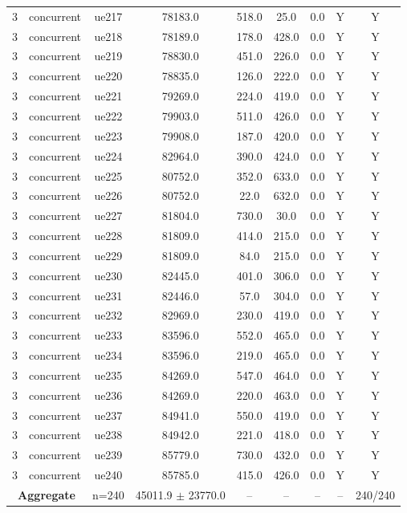 \begin{table}[ht]
\begin{tabular}{|c|c|c|c|c|c|c|c|c|}
3 & concurrent & ue217 & 78183.0 & 518.0 & 25.0 & 0.0 & Y & Y \\
3 & concurrent & ue218 & 78189.0 & 178.0 & 428.0 & 0.0 & Y & Y \\
3 & concurrent & ue219 & 78830.0 & 451.0 & 226.0 & 0.0 & Y & Y \\
3 & concurrent & ue220 & 78835.0 & 126.0 & 222.0 & 0.0 & Y & Y \\
3 & concurrent & ue221 & 79269.0 & 224.0 & 419.0 & 0.0 & Y & Y \\
3 & concurrent & ue222 & 79903.0 & 511.0 & 426.0 & 0.0 & Y & Y \\
3 & concurrent & ue223 & 79908.0 & 187.0 & 420.0 & 0.0 & Y & Y \\
3 & concurrent & ue224 & 82964.0 & 390.0 & 424.0 & 0.0 & Y & Y \\
3 & concurrent & ue225 & 80752.0 & 352.0 & 633.0 & 0.0 & Y & Y \\
3 & concurrent & ue226 & 80752.0 & 22.0 & 632.0 & 0.0 & Y & Y \\
3 & concurrent & ue227 & 81804.0 & 730.0 & 30.0 & 0.0 & Y & Y \\
3 & concurrent & ue228 & 81809.0 & 414.0 & 215.0 & 0.0 & Y & Y \\
3 & concurrent & ue229 & 81809.0 & 84.0 & 215.0 & 0.0 & Y & Y \\
3 & concurrent & ue230 & 82445.0 & 401.0 & 306.0 & 0.0 & Y & Y \\
3 & concurrent & ue231 & 82446.0 & 57.0 & 304.0 & 0.0 & Y & Y \\
3 & concurrent & ue232 & 82969.0 & 230.0 & 419.0 & 0.0 & Y & Y \\
3 & concurrent & ue233 & 83596.0 & 552.0 & 465.0 & 0.0 & Y & Y \\
3 & concurrent & ue234 & 83596.0 & 219.0 & 465.0 & 0.0 & Y & Y \\
3 & concurrent & ue235 & 84269.0 & 547.0 & 464.0 & 0.0 & Y & Y \\
3 & concurrent & ue236 & 84269.0 & 220.0 & 463.0 & 0.0 & Y & Y \\
3 & concurrent & ue237 & 84941.0 & 550.0 & 419.0 & 0.0 & Y & Y \\
3 & concurrent & ue238 & 84942.0 & 221.0 & 418.0 & 0.0 & Y & Y \\
3 & concurrent & ue239 & 85779.0 & 730.0 & 432.0 & 0.0 & Y & Y \\
3 & concurrent & ue240 & 85785.0 & 415.0 & 426.0 & 0.0 & Y & Y \\
\multicolumn{2}{|c|}{\textbf{Aggregate}} & n=240 & 45011.9 $\pm$ 23770.0 & -- & -- & -- & -- & 240/240 \\

\end{tabular}
\end{table}
